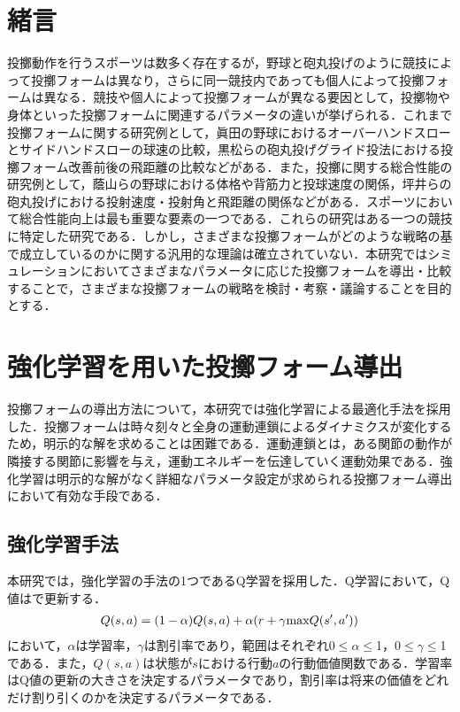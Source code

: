 \begin{small}

\section{緒言}
投擲動作を行うスポーツは数多く存在するが，野球と砲丸投げのように競技によって投擲フォームは異なり，さらに同一競技内であっても個人によって投擲フォームは異なる．競技や個人によって投擲フォームが異なる要因として，投擲物や身体といった投擲フォームに関連するパラメータの違いが挙げられる．これまで投擲フォームに関する研究例として，眞田の野球におけるオーバーハンドスローとサイドハンドスローの球速の比較\cite{sanada}，黒松らの砲丸投げグライド投法における投擲フォーム改善前後の飛距離の比較\cite{kuromatsu}などがある．また，投擲に関する総合性能の研究例として，蔭山らの野球における体格や背筋力と投球速度の関係\cite{kageyama}，坪井らの砲丸投げにおける投射速度・投射角と飛距離の関係\cite{tsuboi}などがある．スポーツにおいて総合性能向上は最も重要な要素の一つである．これらの研究はある一つの競技に特定した研究である．しかし，さまざまな投擲フォームがどのような戦略の基で成立しているのかに関する汎用的な理論は確立されていない．本研究ではシミュレーションにおいてさまざまなパラメータに応じた投擲フォームを導出・比較することで，さまざまな投擲フォームの戦略を検討・考察・議論することを目的とする．\\
\section{強化学習を用いた投擲フォーム導出}
投擲フォームの導出方法について，本研究では強化学習による最適化手法を採用した．投擲フォームは時々刻々と全身の運動連鎖\cite{burkhart}によるダイナミクスが変化するため，明示的な解を求めることは困難である．運動連鎖とは，ある関節の動作が隣接する関節に影響を与え，運動エネルギーを伝達していく運動効果である．強化学習は明示的な解がなく詳細なパラメータ設定が求められる投擲フォーム導出において有効な手段である．
\subsection{強化学習手法}
本研究では，強化学習の手法の1つであるQ学習\cite{watkins}を採用した．Q学習において，Q値はで更新する．
\begin{eqnarray}
  \equlabel{1}
  Q(s,a)=(1-\alpha)Q(s,a)+\alpha(r+\gamma \mathrm{max}Q(s',a'))
\end{eqnarray}
において，$\alpha$は学習率，$\gamma$は割引率であり，範囲はそれぞれ0$\leq$$\alpha$$\leq$1，0$\leq$$\gamma$$\leq$1である．また，$Q(s,a)$は状態が$s$における行動$a$の行動価値関数である．学習率はQ値の更新の大きさを決定するパラメータであり，割引率は将来の価値をどれだけ割り引くのかを決定するパラメータである．

\end{small}
